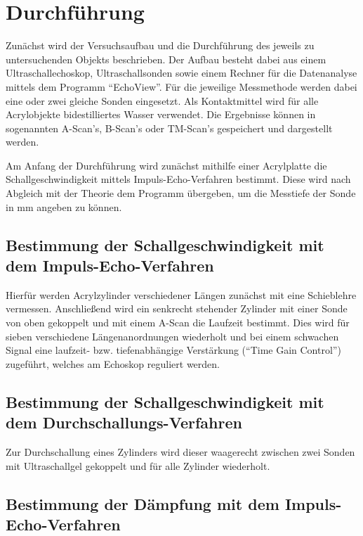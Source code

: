 \section{Durchführung}
\label{sec:Durchführung}

Zunächst wird der Versuchsaufbau und die Durchführung des jeweils zu untersuchenden Objekts beschrieben.
Der Aufbau besteht dabei aus einem Ultraschallechoskop, Ultraschallsonden sowie einem Rechner für die Datenanalyse mittels dem Programm \enquote{EchoView}.
Für die jeweilige Messmethode werden dabei eine oder zwei gleiche Sonden eingesetzt. 
Als Kontaktmittel wird für alle Acrylobjekte  bidestilliertes Wasser verwendet.
Die Ergebnisse können in sogenannten A-Scan's, B-Scan's oder TM-Scan's gespeichert und dargestellt werden.

Am Anfang der Durchführung wird zunächst mithilfe einer Acrylplatte die Schallgeschwindigkeit mittels Impuls-Echo-Verfahren bestimmt.
Diese wird nach Abgleich mit der Theorie dem Programm übergeben, um die Messtiefe der Sonde in $\unit{\milli\meter}$ angeben zu können.


\subsection{Bestimmung der Schallgeschwindigkeit mit dem Impuls-Echo-Verfahren} \label{sec:schallecho}

Hierfür werden Acrylzylinder verschiedener Längen zunächst mit eine Schieblehre vermessen. 
Anschließend wird ein senkrecht stehender Zylinder mit einer Sonde von oben gekoppelt und mit einem A-Scan die Laufzeit bestimmt.
Dies wird für sieben verschiedene Längenanordnungen wiederholt und bei einem schwachen Signal eine 
laufzeit- bzw. tiefenabhängige Verstärkung (\enquote{Time Gain Control}) zugeführt, welches am Echoskop reguliert werden.


\subsection{Bestimmung der Schallgeschwindigkeit mit dem Durchschallungs-Verfahren}

Zur Durchschallung eines Zylinders wird dieser waagerecht zwischen zwei Sonden mit Ultraschallgel gekoppelt und für alle Zylinder wiederholt.


\subsection{Bestimmung der Dämpfung mit dem Impuls-Echo-Verfahren}

